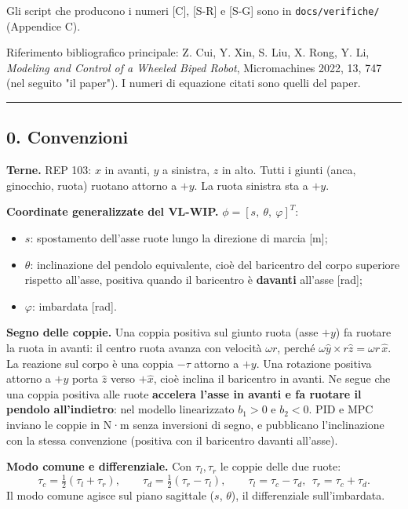 \documentclass[
]{article}
\providecommand{\tightlist}{%
  \setlength{\itemsep}{0pt}\setlength{\parskip}{0pt}}
\begin{document}
Gli script che producono i numeri [C], [S-R] e [S-G] sono in \texttt{docs/verifiche/} (Appendice C).

Riferimento bibliografico principale: Z. Cui, Y. Xin, S. Liu, X. Rong, Y. Li, \emph{Modeling and Control of a Wheeled Biped Robot}, Micromachines 2022, 13, 747 (nel seguito "il paper"). I numeri di equazione citati sono quelli del paper.

\begin{center}\rule{0.5\linewidth}{0.5pt}\end{center}

\subsection{0. Convenzioni}\label{0-convenzioni}

\textbf{Terne.} REP 103: \(x\) in avanti, \(y\) a sinistra, \(z\) in alto. Tutti i giunti (anca, ginocchio, ruota) ruotano attorno a \(+y\). La ruota sinistra sta a \(+y\).

\textbf{Coordinate generalizzate del VL-WIP.} \(\phi = [s,\ \theta,\ \varphi]^T\):

\begin{itemize}
\tightlist
\item \(s\): spostamento dell'asse ruote lungo la direzione di marcia [m];
\item \(\theta\): inclinazione del pendolo equivalente, cioè del baricentro del corpo superiore rispetto all'asse, positiva quando il baricentro è \textbf{davanti} all'asse [rad];
\item \(\varphi\): imbardata [rad].
\end{itemize}

\textbf{Segno delle coppie.} Una coppia positiva sul giunto ruota (asse \(+y\)) fa ruotare la ruota in avanti: il centro ruota avanza con velocità \(\omega r\), perché \(\omega\hat y \times r\hat z = \omega r\,\hat x\). La reazione sul corpo è una coppia \(-\tau\) attorno a \(+y\). Una rotazione positiva attorno a \(+y\) porta \(\hat z\) verso \(+\hat x\), cioè inclina il baricentro in avanti. Ne segue che una coppia positiva alle ruote \textbf{accelera l'asse in avanti e fa ruotare il pendolo all'indietro}: nel modello linearizzato \(b_1 > 0\) e \(b_2 < 0\). PID e MPC inviano le coppie in N·m senza inversioni di segno, e pubblicano l'inclinazione con la stessa convenzione (positiva con il baricentro davanti all'asse).

\textbf{Modo comune e differenziale.} Con \(\tau_l, \tau_r\) le coppie delle due ruote: \[\tau_c = \tfrac12(\tau_l+\tau_r), \qquad \tau_d = \tfrac12(\tau_r-\tau_l), \qquad \tau_l = \tau_c-\tau_d,\ \ \tau_r = \tau_c+\tau_d .\] Il modo comune agisce sul piano sagittale (\(s\), \(\theta\)), il differenziale sull'imbardata.
\end{document}
